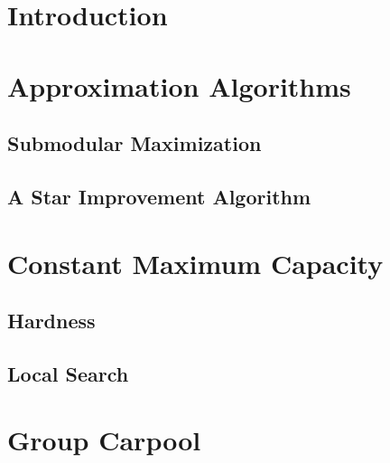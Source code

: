 \section{Introduction}

\section{Approximation Algorithms}
\label{sec:approx}

\subsection{Submodular Maximization}
\label{sec:sub}
   \subsection{A Star Improvement Algorithm}
   \label{sec:improve}

\section{Constant Maximum Capacity}
\label{sec:cmax}
   \subsection{Hardness}
   \label{sec:hardness}

   \subsection{Local Search}
   \label{sec:local}

\section{Group Carpool}
\label{sec:group}

